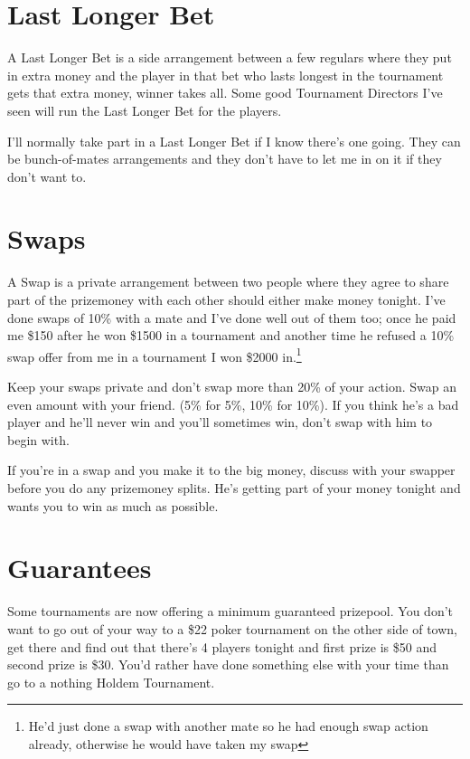 \section{Last Longer Bet}

A Last Longer Bet is a side arrangement between a few regulars
where they put in extra money and the player
in that bet who lasts longest in the tournament gets that extra
money, winner takes all. Some good Tournament Directors I've seen
will run the Last Longer Bet for the players.

I'll normally take part in a Last Longer Bet if I know there's one
going. They can be bunch-of-mates arrangements and
they don't have to let me in on it if they don't want to.

\section{Swaps}

A Swap is a private arrangement between two people where they
agree to share part of the prizemoney with each other should
either make money tonight. I've done swaps of 10\% with a mate and
I've done well out of them too; once he paid me
\$150 after he won \$1500 in a tournament and another time
he refused a 10\% swap offer from me in a tournament I won \$2000
in.\footnote{He'd just done a swap with another mate so he had enough
swap action already, otherwise he would have taken my swap}

Keep your swaps private and don't swap more than 20\% of your action.
Swap an even amount with your friend. (5\% for 5\%, 10\% for 10\%).
If you think he's a bad player and he'll never win and
you'll sometimes win, don't swap with him to begin with.

If you're in a swap and you make it to the big money, discuss
with your swapper before you do any prizemoney splits. He's
getting part of your money tonight and wants you to win as
much as possible.

\section{Guarantees}

Some tournaments are now offering a minimum guaranteed prizepool. You
don't want to go out of your way to a \$22 poker tournament on the
other side of town, get there and find out that there's 4 players tonight
and first prize is \$50 and second prize is \$30. You'd rather have
done something else with your time than go to a nothing Holdem Tournament.

